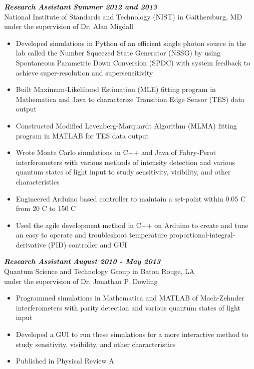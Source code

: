 \documentclass{res}
\begin{document}
\begin{resume}
        {\bfseries {\em Research Assistant}} \hfill {\bfseries{\em Summer 2012 and 2013}} \\
National Institute of Standards and Technology (NIST) in Gaithersburg, MD \\
                 under the supervision of Dr. Alan Migdall
                 \begin{itemize}  \itemsep -2pt %
                 \item Developed simulations in Python of an efficient single photon source in the lab called the Number Squeezed State Generator (NSSG) by using Spontaneous Parametric Down Conversion (SPDC) with system feedback to achieve super-resolution and supersensitivity
		\item Built Maximum-Likelihood Estimation (MLE) fitting program in Mathematica and Java to characterize Transition Edge Sensor (TES) data output
	 	\item Constructed Modified Levenberg-Marquardt Algorithm (MLMA) fitting program in MATLAB for TES data output
	 	\item Wrote Monte Carlo simulations in C++ and Java of Fabry-Perot interferometers with various methods of intensity detection and various quantum states of light input to study sensitivity, visibility, and other characteristics
		\item Engineered Arduino based controller to maintain a set-point within 0.05 C from 20 C to 150 C
	 	\item Used the agile development method in C++ on Arduino to create and tune an easy to operate and troubleshoot temperature proportional-integral-derivative (PID) controller and GUI 
                 \end{itemize}
	{\bfseries {\em  Research Assistant}}  \hfill  {\bfseries{\em August 2010 - May 2013}} \\
		Quantum Science and Technology Group in Baton Rouge, LA \\                 
                 under the supervision of Dr. Jonathan P. Dowling
                 \begin{itemize}  \itemsep -2pt %
		\item Programmed simulations in Mathematica and MATLAB of Mach-Zehnder \\ interferometers with parity detection and various quantum states of light input
		\item Developed a GUI to run these simulations for a more interactive method to study sensitivity, visibility, and other characteristics 
		\item Published in Physical Review A
                 \end{itemize}


\end{resume}
\end{document}
